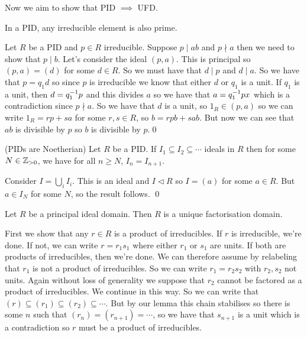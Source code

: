 \documentclass{article}
\newcommand{\nrm}{\triangleleft}
\begin{document}
\begin{itemize}
\begin{definition}
\begin{itemize}
	\end{itemize} 
\end{definition}
Now we aim to show that PID $ \implies $ UFD.
\begin{lemma}
  In a PID, any irreducible element is also prime.
\end{lemma}
\pf Let $ R $ be a PID and $ p\in R $ irreducible. Suppose $ p\mid ab $ and $ p\nmid a $ then we need to show that $ p\mid b $. Let's consider the ideal $ (p, a) $. This is principal so $ (p,a)=(d) $ for some $ d\in R $. So we must have that $ d\mid p $ and $ d\mid a $. So we have that $ p=q_1d $ so since $ p $ is irreducible we know that either $ d $ or $ q_1 $ is a unit. If $ q_1 $ is a unit, then $ d={q}^{-1}_1 p $ and this divides $ a $ so we have that $ a={q}^{-1}_1px $ which is a contradiction since $ p\nmid a $. So we have that $ d $ is a unit, so $ 1_R\in (p,a) $ so we can write $ 1_R=rp+sa $ for some $ r,s\in R $, so $ b=rpb+sab $. But now we can see that $ ab $ is divisible by $ p $ so $ b $ is divisible by $ p $.\qed
\begin{lemma}
	(PIDs are Noetherian) Let $ R $ be a PID. If $ I_1\subseteq I_2\subseteq\cdots $ ideals in $ R $ then for some $ N\in \mathbb{Z}_{> 0} $, we have for all $ n\ge N $, $ I_n=I_{n+1} $.
\end{lemma}
\pf Consider $ I=\bigcup_iI_i $. This is an ideal and $ I\nrm R $ so $ I=(a) $ for some $ a\in R $. But $ a\in I_N $ for some $ N $, so the result follows. \qed
\begin{theorem}
  Let $ R $ be a principal ideal domain. Then $ R $ is a unique factorisation domain.
\end{theorem}
\pf First we show that any $ r\in R $ is a product of irreducibles. If $ r $ is irreducible, we're done. If not, we can write $ r=r_1s_1 $ where either $ r_1 $ or $ s_1 $ are units. If both are products of irreducibles, then we're done. We can therefore assume by relabeling that $ r_1 $ is not a product of irreducibles. So we can write $ r_1=r_2s_2 $ with $ r_2,s_2 $ not units. Again without loss of generality we suppose that $ r_2 $ cannot be factored as a product of irreducibles. We continue in this way. So we can write that $ (r)\subseteq (r_1)\subseteq (r_2)\subseteq\cdots $. But by our lemma this chain stabilises so there is some $ n $ such that $ (r_n)=(r_{n+1})=\cdots $, so we have that $ s_{n+1} $ is a unit which is a contradiction so $ r $ must be a product of irreducibles.\\

\end{itemize}
\end{document}

